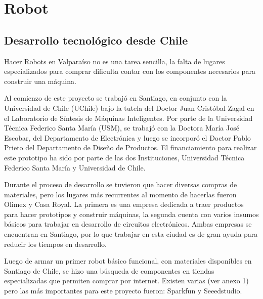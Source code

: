 


\chapter{Robot} %

\label{Chapter1} %



\section{Desarrollo tecnológico desde Chile}

Hacer Robots en Valparaíso no es una tarea sencilla, la falta de lugares especializados para comprar dificulta contar con los componentes necesarios para construir una máquina.

Al comienzo de este proyecto se trabajó en Santiago, en conjunto con la Universidad de Chile (UChile) bajo la tutela del Doctor Juan Cristóbal Zagal en el Laboratorio de Síntesis de Máquinas Inteligentes. Por parte de la Universidad Técnica Federico Santa María (USM), se trabajó con la Doctora María José Escobar, del Departamento de Electrónica y luego se incorporó el Doctor Pablo Prieto del Departamento de Diseño de Productos. El financiamiento para realizar este prototipo ha sido por parte de las dos Instituciones, Universidad Técnica Federico Santa María y Universidad de Chile.

Durante el proceso de desarrollo se tuvieron que hacer diversas compras de materiales, pero los lugares más recurrentes al momento de hacerlas fueron Olimex y Casa Royal. La primera es una empresa dedicada a traer productos para hacer prototipos y construir máquinas, la segunda cuenta con varios insumos básicos para trabajar en desarrollo de circuitos electrónicos. Ambas empresas se encuentran en Santiago, por lo que trabajar en esta ciudad es de gran ayuda para reducir los tiempos en desarrollo.

Luego de armar un primer robot básico funcional, con materiales disponibles en Santiago de Chile, se hizo una búsqueda de componentes en tiendas especializadas que permiten comprar por internet. Existen varias (ver anexo 1) pero las más importantes para este proyecto fueron: Sparkfun y Seeedstudio.


